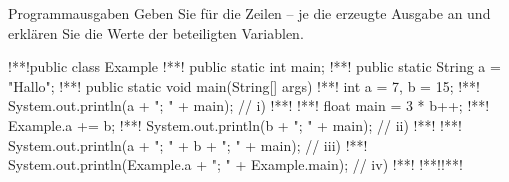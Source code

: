 \begin{frame}[c,fragile]{Programmausgaben}
Geben Sie für die Zeilen -- je die erzeugte Ausgabe an und erklären Sie die Werte der beteiligten Variablen.
\begin{plainjava}
!**!public class Example {
!**!   public static int main;
!**!   public static String a = "Hallo";
!**!   public static void main(String[] args) {
!**!      int a = 7,  b = 15;
!**!      System.out.println(a + "; " + main); // i)
!**!      {
!**!         float main = 3 * b++;
!**!         Example.a += b;
!**!         System.out.println(b + "; " + main); // ii)
!**!      }
!**!      System.out.println(a + "; " + b + "; " + main); // iii)
!**!      System.out.println(Example.a + "; " + Example.main); // iv)
!**!   }
!**!}!**!
\end{plainjava}
%
\end{frame}
\SidebarReset
\SidebarSolution
\def\Show<#1>#2;{\onslide<#1->{{\only<#1|handout:1>{\colorlet{@}{gray}}\path[@]#2;}}}
\def\ShowFull<#1>#2;{\onslide<#1-|handout:2>{{\only<#1>{\colorlet{@}{gray}}\path[@]#2;}}}
